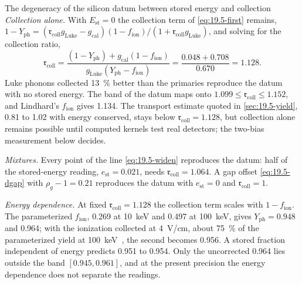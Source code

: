 \begin{workedexample}{The degeneracy of the silicon datum between stored energy and collection}
\emph{Collection alone.} With $E_{\mathrm{st}} = 0$ the collection term of \cref{eq:19.5-first} remains, $1 - Y_{\mathrm{ph}} = (\mathfrak{r}_{\mathrm{coll}}g_{\mathrm{Luke}} - g_{\mathrm{cal}})(1 - f_{\mathrm{ion}})/(1 + \mathfrak{r}_{\mathrm{coll}}g_{\mathrm{Luke}})$, and solving for the collection ratio,
\begin{equation*}
  \mathfrak{r}_{\mathrm{coll}} = \frac{(1 - Y_{\mathrm{ph}}) + g_{\mathrm{cal}}(1 - f_{\mathrm{ion}})}{g_{\mathrm{Luke}}(Y_{\mathrm{ph}} - f_{\mathrm{ion}})} = \frac{0.048 + 0.708}{0.670} = 1.128 .
\end{equation*}
Luke phonons collected \SI{13}{\percent} better than the primaries reproduce the datum with no stored energy. The band of the datum maps onto $1.099 \le \mathfrak{r}_{\mathrm{coll}} \le 1.152$, and Lindhard's $f_{\mathrm{ion}}$ gives 1.134. The transport estimate quoted in \cref{sec:19.5-yield}, 0.81 to 1.02 with energy conserved, stays below $\mathfrak{r}_{\mathrm{coll}} = 1.128$, but collection alone remains possible until computed kernels test real detectors; the two-bias measurement below decides.

\emph{Mixtures.} Every point of the line \cref{eq:19.5-widen} reproduces the datum: half of the stored-energy reading, $e_{\mathrm{st}} = 0.021$, needs $\mathfrak{r}_{\mathrm{coll}} = 1.064$. A gap offset \cref{eq:19.5-dgap} with $\rho_g - 1 = 0.21$ reproduces the datum with $e_{\mathrm{st}} = 0$ and $\mathfrak{r}_{\mathrm{coll}} = 1$.

\emph{Energy dependence.} At fixed $\mathfrak{r}_{\mathrm{coll}} = 1.128$ the collection term scales with $1 - f_{\mathrm{ion}}$. The parameterized $f_{\mathrm{ion}}$, 0.269 at \SI{10}{keV} and 0.497 at \SI{100}{keV}, gives $Y_{\mathrm{ph}} = 0.948$ and 0.964; with the ionization collected at \SI{4}{V/cm}, about \SI{75}{\percent} of the parameterized yield at \SI{100}{keV}~\cite[Sect.~4]{agnese2018nuclear}, the second becomes 0.956. A stored fraction independent of energy predicts 0.951 to 0.954. Only the uncorrected 0.964 lies outside the band $[0.945, 0.961]$, and at the present precision the energy dependence does not separate the readings.
\end{workedexample}

